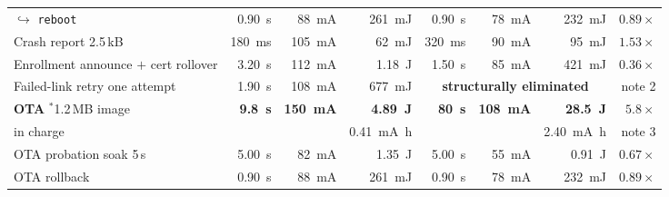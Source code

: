 \documentclass[10pt,a4paper]{article}
\newcommand{\good}[1]{\textcolor{ok}{\textbf{#1}}}
\newcommand{\bad}[1]{\textcolor{warn}{\textbf{#1}}}
\newcommand{\meas}{\textcolor{ok}{$^{\ast}$}}
\begin{document}
\begin{center}
\begin{tabular}{@{}lrrrrrrr@{}}
\quad$\hookrightarrow$ \texttt{reboot} & \SI{0.90}{\second} & \SI{88}{\milli\ampere} & \SI{261}{\milli\joule} & \SI{0.90}{\second} & \SI{78}{\milli\ampere} & \SI{232}{\milli\joule} & $0.89\times$ \\
\addlinespace[1mm]
Crash report \footnotesize 2.5\,kB & \SI{180}{\milli\second} & \SI{105}{\milli\ampere} & \SI{62}{\milli\joule} & \SI{320}{\milli\second} & \SI{90}{\milli\ampere} & \SI{95}{\milli\joule} & \bad{$1.53\times$} \\
Enrollment \footnotesize announce $+$ cert rollover & \SI{3.20}{\second} & \SI{112}{\milli\ampere} & \SI{1.18}{\joule} & \SI{1.50}{\second} & \SI{85}{\milli\ampere} & \SI{421}{\milli\joule} & \good{$0.36\times$} \\
Failed-link retry \footnotesize one attempt & \SI{1.90}{\second} & \SI{108}{\milli\ampere} & \SI{677}{\milli\joule} & \multicolumn{3}{c}{\good{\textbf{structurally eliminated}}} & \footnotesize note 2 \\
\midrule
\textbf{OTA} \meas \footnotesize 1.2\,MB image & \textbf{\SI{9.8}{\second}} & \textbf{\SI{150}{\milli\ampere}} & \textbf{\SI{4.89}{\joule}} & \textbf{\SI{80}{\second}} & \textbf{\SI{108}{\milli\ampere}} & \bad{\textbf{\SI{28.5}{\joule}}} & \bad{$\mathbf{5.8\times}$} \\
\footnotesize\quad in charge & & & \footnotesize\SI{0.41}{\milli\ampere\hour} & & & \footnotesize\SI{2.40}{\milli\ampere\hour} & \footnotesize note 3 \\
OTA probation soak \footnotesize 5\,s & \SI{5.00}{\second} & \SI{82}{\milli\ampere} & \SI{1.35}{\joule} & \SI{5.00}{\second} & \SI{55}{\milli\ampere} & \SI{0.91}{\joule} & $0.67\times$ \\
OTA rollback & \SI{0.90}{\second} & \SI{88}{\milli\ampere} & \SI{261}{\milli\joule} & \SI{0.90}{\second} & \SI{78}{\milli\ampere} & \SI{232}{\milli\joule} & $0.89\times$ \\
\bottomrule
\end{tabular}
\end{center}
\end{document}

